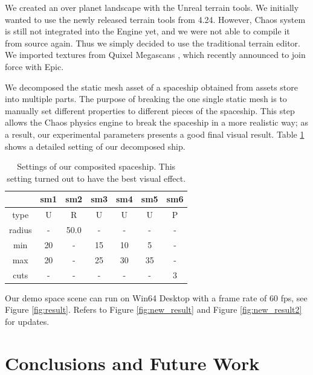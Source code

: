 \documentclass[sigconf]{acmart}
\begin{document}
We created an over planet landscape with the Unreal terrain tools. We initially wanted to use the newly released terrain tools from 4.24. However, Chaos system is still not integrated into the Engine yet, and we were not able to compile it from source again. Thus we simply decided to use the traditional terrain editor. We imported textures from Quixel Megascans \cite{quixel}, which recently announced to join force with Epic. 

We decomposed the static mesh asset of a spaceship obtained from assets store into multiple parts. The purpose of breaking the one single static mesh is to manually set different properties to different pieces of the spaceship. This step allows the Chaos physics engine to break the spaceship in a more realistic way; as a result, our experimental parameters presents a good final visual result. Table \ref{table:setting} shows a detailed setting of our decomposed ship.

\begin{table}[]
\begin{tabular}{|c|c|c|c|c|c|c|}
\hline
       & sm1 & sm2  & sm3 & sm4 & sm5 & sm6 \\ \hline
type   & U   & R    & U   & U   & U   & P   \\ \hline
radius & -   & 50.0 & -   & -   & -   & -   \\ \hline
min    & 20  & -    & 15  & 10  & 5   & -   \\ \hline
max    & 20  & -    & 25  & 30  & 35  & -   \\ \hline
cuts   & -   & -    & -   & -   & -   & 3   \\ \hline
\end{tabular}
\caption{Settings of our composited spaceship. This setting turned out to have the best visual effect.}
\label{table:setting}
\end{table}

Our demo space scene can run on Win64 Desktop with a frame rate of 60 fps, see Figure \ref{fig:result}. Refers to Figure \ref{fig:new_result} and Figure \ref{fig:new_result2} for updates.

\section{Conclusions and Future Work}
\end{document}
